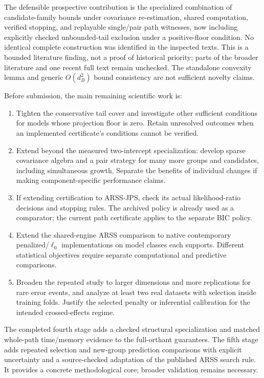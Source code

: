 \documentclass[11pt,a4paper]{article}
\theoremstyle{remark}\newtheorem{remark}[theorem]{Remark}
\begin{document}
The defensible prospective contribution is the specialized combination of
candidate-family bounds under covariance re-estimation, shared computation,
verified stopping, and replayable single/pair path witnesses, now including
explicitly checked unbounded-tail exclusion under a positive-floor condition. No identical
complete construction was identified in the inspected texts. This is a bounded
literature finding, not a proof of historical priority; parts of the broader
literature and one recent full text remain unchecked. The standalone convexity
lemma and generic $O(d_B^2)$ bound consistency are not sufficient novelty claims.

Before submission, the main remaining scientific work is:
\begin{enumerate}
\item Tighten the conservative tail cover and investigate other sufficient
conditions for models whose projection floor is zero. Retain unresolved outcomes
when an implemented certificate's conditions cannot be verified.
\item Extend beyond the measured two-intercept specialization: develop sparse
covariance algebra and a pair strategy for many more groups and candidates,
including simultaneous growth. Separate the benefits of individual changes
if making component-specific performance claims.
\item If extending certification to ARSS-JPS, check its actual likelihood-ratio
decisions and stopping rules. The archived policy is already used as a comparator;
the current path certificate applies to the separate BIC policy.
\item Extend the shared-engine ARSS comparison to native contemporary
penalized/$\ell_0$ implementations on model classes each supports. Different
statistical objectives require separate computational and predictive comparisons.
\item Broaden the repeated study to larger dimensions and more replications
for rare error events, and analyze at least two real datasets
with selection inside training folds. Justify the selected penalty or inferential
calibration for the intended crossed-effects regime.
\end{enumerate}
The completed fourth stage adds a checked structural specialization and matched
whole-path time/memory evidence to the full-orthant guarantees. The fifth stage
adds repeated selection and new-group prediction comparisons with explicit
uncertainty and a source-checked adaptation of the published ARSS search rule.
It provides a concrete methodological core; broader validation remains necessary.
\end{document}
